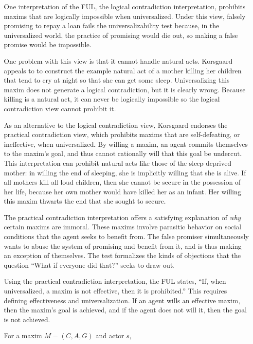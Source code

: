 \begin{isabellebody}
\begin{isamarkuptext}
One interpretation of the FUL, the logical contradiction interpretation, prohibits maxims that are 
logically impossible when universalized. Under this view, falsely promising to repay a loan fails the 
universalizability test because, in the universalized world, the practice of promising would die out, 
so making a false promise would be impossible.

One problem with this view is that it cannot handle natural acts. Korsgaard appeals to 
\citet{dietrichson} to construct the example natural act of a mother killing her children that tend to 
cry at night so that she can get some sleep. Universalizing this maxim does not generate a logical 
contradiction, but it is clearly wrong. Because killing is a natural act, it can never be logically 
impossible so the logical contradiction view cannot prohibit it.

As an alternative to the logical contradiction view, Korsgaard endorses the practical contradiction view, 
which prohibits maxims that are self-defeating, or ineffective, when universalized. By willing a maxim, 
an agent commits themselves to the maxim's goal, and thus cannot rationally will that this goal be 
undercut. This interpretation can prohibit natural acts like those of the sleep-deprived mother: in 
willing the end of sleeping, she is implicitly willing that she is alive. If all mothers kill all 
loud children, then she cannot be secure in the possession of her life, because her own mother would 
have killed her as an infant. Her willing this maxim thwarts the end that she sought to secure. 

The practical contradiction interpretation offers a satisfying explanation of \emph{why} certain 
maxims are immoral. These maxims involve parasitic behavior on social conditions that the agent seeks 
to benefit from. The false promiser simultaneously wants to abuse the system of promising and benefit 
from it, and is thus making an exception of themselves. The test formalizes the kinds of objections 
that the question ``What if everyone did that?'' seeks to draw out.

Using the practical contradiction interpretation, the FUL states, ``If, when universalized, a maxim is 
not effective, then it is prohibited.'' This requires defining effectiveness and universalization. 
If an agent wills an effective maxim, then the maxim's goal is achieved, and if the agent does 
not will it, then the goal is not achieved. 

\begin{definition}
For a maxim $M = (C, A, G)$ and actor $s$,


\end{definition}
\end{isamarkuptext}
\end{isabellebody}
